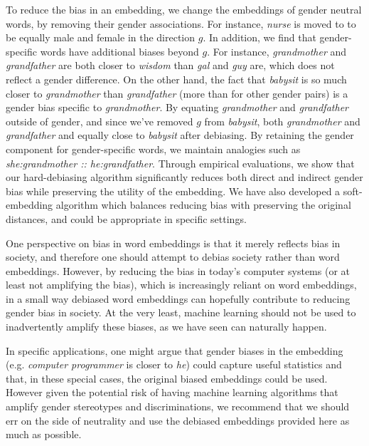 \documentclass{article}
\begin{document}
To reduce the bias in an embedding, we change the embeddings of gender neutral words, by removing their gender associations. For instance, {\em nurse} is moved to to be equally male and female in the direction $g$.  In addition, we find that gender-specific words have additional biases beyond $g$. For instance, {\em grandmother} and {\em grandfather} are both closer to {\em wisdom} than {\em gal} and {\em guy} are, which does not reflect a gender difference. On the other hand, the fact that {\em babysit} is so much closer to {\em grandmother} than {\em grandfather} (more than for other gender pairs) is a gender bias specific to {\em grandmother}. By equating {\em grandmother} and {\em grandfather} outside of gender, and since we've removed $g$ from {\em babysit}, both {\em grandmother} and {\em grandfather} and equally close to {\em babysit} after debiasing. By retaining the gender component for gender-specific words, we maintain analogies such as {\em she:grandmother :: he:grandfather}. Through empirical evaluations, we show that our hard-debiasing algorithm significantly reduces both direct and indirect gender bias while preserving the utility of the embedding. We have also developed a soft-embedding algorithm which balances reducing bias with preserving the original distances, and could be appropriate in specific settings. 

One perspective on bias in word embeddings is that it merely reflects bias in society, and therefore one should attempt to debias society rather than word embeddings. However, by reducing the bias in today's computer systems (or at least not amplifying the bias), which is increasingly reliant on word embeddings, in a small way debiased word embeddings can hopefully contribute to reducing gender bias in society. At the very least, machine learning should not be used to inadvertently amplify these biases, as we have seen can naturally happen. 

In specific applications, one might argue that gender biases in the embedding (e.g. \emph{computer programmer} is closer to \emph{he}) could capture useful statistics and that, in these special cases, the original biased embeddings could be used. However given the potential risk of having machine learning algorithms that amplify gender stereotypes and discriminations, we recommend that we should err on the side of neutrality and use the debiased embeddings provided here as much as possible. 
\end{document}
